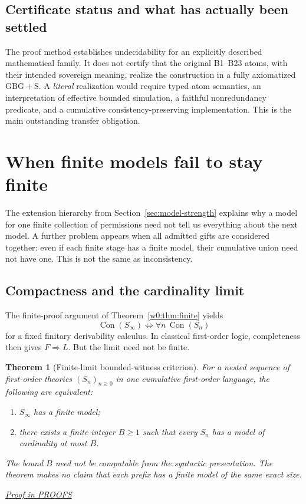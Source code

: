 \documentclass[11pt,letterpaper]{article}
\newtheorem{theorem}{Theorem}[section]
\theoremstyle{definition}\newtheorem{definition}[theorem]{Definition}\newtheorem{example}[theorem]{Example}
\theoremstyle{remark}\newtheorem{remark}[theorem]{Remark}
\newcommand{\Con}{\operatorname{Con}}
\newcommand{\prooflink}[1]{\par\noindent\hfill\small\hyperref[#1]{\textit{Proof in PROOFS}}\normalsize}
\begin{document}
\subsection{Certificate status and what has actually been settled}
The proof method establishes undecidability for an explicitly described mathematical family. It does not certify that the original B1--B23 atoms, with their intended sovereign meaning, realize the construction in a fully axiomatized $\mathrm{GBG+S}$. A \emph{literal} realization would require typed atom semantics, an interpretation of effective bounded simulation, a faithful nonredundancy predicate, and a cumulative consistency-preserving implementation. This is the main outstanding transfer obligation.


\section{When finite models fail to stay finite}\label{sec:limit-braid}
The extension hierarchy from Section~\ref{sec:model-strength} explains why a
model for one finite collection of permissions need not tell us everything
about the next model. A further problem appears when all admitted gifts are
considered together: even if each finite stage has a finite model, their
cumulative union need not have one. This is not the same as inconsistency.

\subsection{Compactness and the cardinality limit}
The finite-proof argument of Theorem~\ref{w0:thm:finite} yields
\[
 \Con(S_\infty)\iff \forall n\,\Con(S_n)
\]
for a fixed finitary derivability calculus. In classical first-order logic, completeness then gives $F\Rightarrow L$. But the limit need not be finite.

\begin{theorem}[Finite-limit bounded-witness criterion]\label{w2:th:bounded}
For a nested sequence of first-order theories $(S_n)_{n\ge0}$ in one cumulative first-order language, the following are equivalent:
\begin{enumerate}[label=\textup{(\alph*)}]
\item $S_\infty$ has a finite model;
\item there exists a finite integer $B\ge1$ such that \emph{every} $S_n$ has a model of cardinality at most $B$.
\end{enumerate}
The bound $B$ need not be computable from the syntactic presentation. The theorem makes no claim that each prefix has a finite model of the \emph{same} exact size.
\prooflink{w2:pr:bounded}
\end{theorem}
\end{document}
